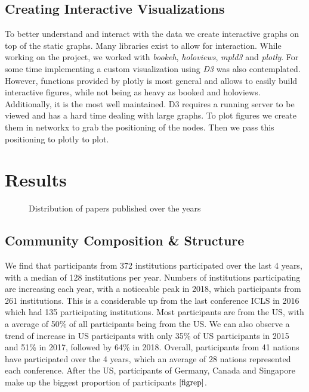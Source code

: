 \documentclass[journal,twocolumn]{IEEEtran}
\begin{document}
    \subsection{Creating Interactive
Visualizations}\label{creating-interactive-visualizations}

To better understand and interact with the data we create interactive
graphs on top of the static graphs. Many libraries exist to allow for
interaction. While working on the project, we worked with \emph{bookeh},
\emph{holoviews}, \emph{mpld3} and \emph{plotly}. For some time
implementing a custom visualization using \emph{D3} was also
contemplated. However, functions provided by plotly is most general and
allows to easily build interactive figures, while not being as heavy as
booked and holoviews. Additionally, it is the most well maintained. D3
requires a running server to be viewed and has a hard time dealing with
large graphs. To plot figures we create them in networkx to grab the
positioning of the nodes. Then we pass this positioning to plotly to
plot.

    \section{Results}\label{results}


    \begin{figure}
        \begin{center}\end{center}
        \caption{Distribution of papers published over the years}
        \label{fig1}
    \end{figure}
    
    \subsection{Community Composition \&
Structure}\label{community-composition-structure}

We find that participants from 372 institutions participated over the
last 4 years, with a median of 128 institutions per year. Numbers of
institutions participating are increasing each year, with a noticeable
peak in 2018, which participants from 261 institutions. This is a
considerable up from the last conference ICLS in 2016 which had 135
participating institutions. Most participants are from the US, with a
average of 50\% of all participants being from the US. We can also
observe a trend of increase in US participants with only 35\% of US
participants in 2015 and 51\% in 2017, followed by 64\% in 2018.
Overall, participants from 41 nations have participated over the 4
years, which an average of 28 nations represented each conference. After
the US, participants of Germany, Canada and Singapore make up the
biggest proportion of participants \(\ref{figrep}\).
\end{document}
